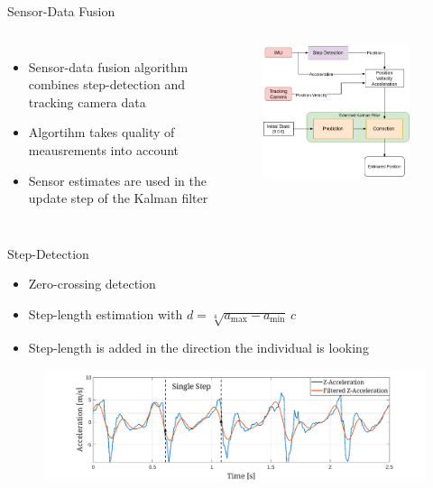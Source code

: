 \documentclass[aspectratio=169,handout]{beamer}
\begin{document}
{	
	\begin{frame}{Sensor-Data Fusion}
		\begin{columns}
				\begin{itemize}
				\item<2-> Sensor-data fusion algorithm combines step-detection and tracking camera data
				\item<3-> Algortihm takes quality of meausrements into account
				\item<4-> Sensor estimates are used in the update step of the Kalman filter
			\end{itemize}
			\begin{figure}
				\centering
				\includegraphics[width=0.9\textwidth]{schema1.png}
			\end{figure}
		\end{columns}
	
	\end{frame}
	
		\begin{frame}{Step-Detection}
		\begin{itemize}
			\item<2-> Zero-crossing detection 
			\item<3-> Step-length estimation with $d = \sqrt[4]{a_{\max}-a_{\min}}  \, c$
			\item<4-> Step-length is added in the direction the individual is looking
		\end{itemize}
		
		\vspace{0.5cm}
		\begin{figure}
			\centering
			\includegraphics[width=0.9\linewidth]{../Conference_Paper/WalkAcceleration}
		\end{figure}
		

\end{frame}}
\end{document}
